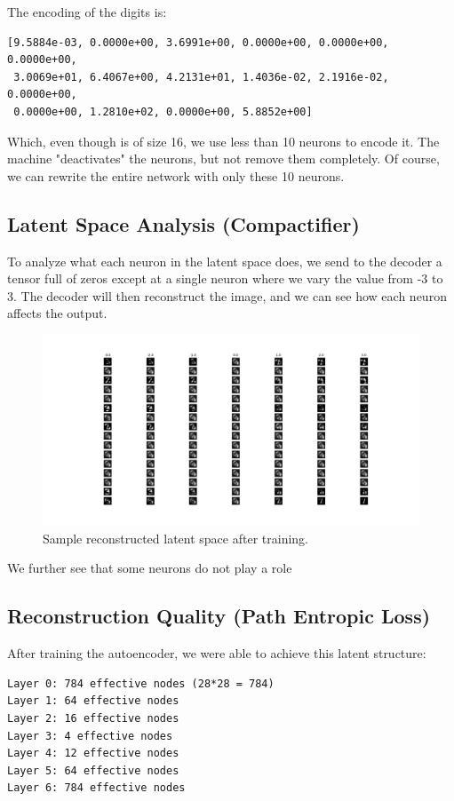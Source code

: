 \documentclass[12pt]{article}
\begin{document}
The encoding of the digits is:
\begin{verbatim}
[9.5884e-03, 0.0000e+00, 3.6991e+00, 0.0000e+00, 0.0000e+00, 0.0000e+00,
 3.0069e+01, 6.4067e+00, 4.2131e+01, 1.4036e-02, 2.1916e-02, 0.0000e+00,
 0.0000e+00, 1.2810e+02, 0.0000e+00, 5.8852e+00]
\end{verbatim}

Which, even though is of size 16, we use less than 10 neurons to encode it. The machine "deactivates" the neurons, but not remove them completely. Of course, we can rewrite the entire network with only these 10 neurons.

\subsection{Latent Space Analysis (Compactifier)}
To analyze what each neuron in the latent space does, we send to the decoder a tensor full of zeros except at a single neuron where we vary the value from -3 to 3. The decoder will then reconstruct the image, and we can see how each neuron affects the output.

\begin{figure}[ht]
    \centering
    \includegraphics[width=1\textwidth]{latent_analyse.png}
    \caption{Sample reconstructed latent space after training.}
\end{figure}

We further see that some neurons do not play a role

\subsection{Reconstruction Quality (Path Entropic Loss)}

After training the autoencoder, we were able to achieve this latent structure:

\begin{verbatim}
Layer 0: 784 effective nodes (28*28 = 784)
Layer 1: 64 effective nodes
Layer 2: 16 effective nodes
Layer 3: 4 effective nodes
Layer 4: 12 effective nodes
Layer 5: 64 effective nodes
Layer 6: 784 effective nodes
\end{verbatim}
\end{document}
